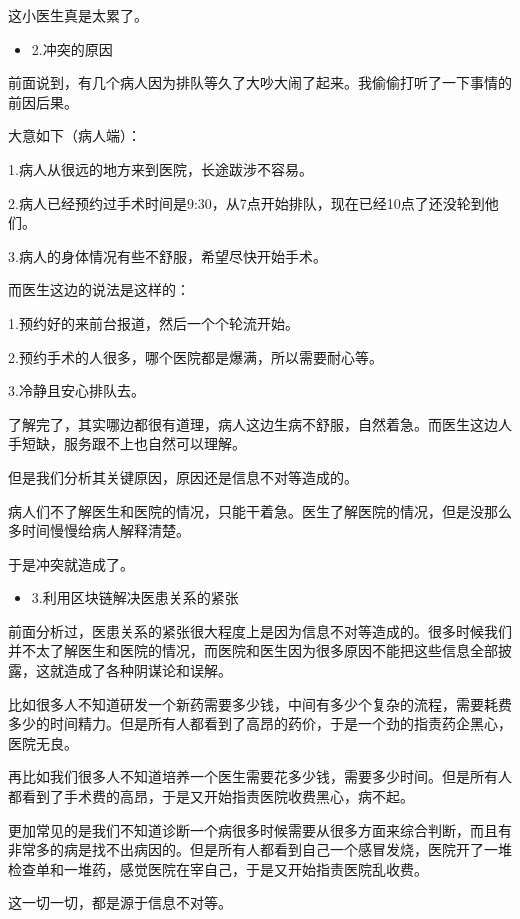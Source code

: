 \documentclass[]{ctexbook}
\providecommand{\tightlist}{%
  \setlength{\itemsep}{0pt}\setlength{\parskip}{0pt}}
\begin{document}
这小医生真是太累了。

\begin{itemize}
\tightlist
\item
  2.冲突的原因
\end{itemize}

前面说到，有几个病人因为排队等久了大吵大闹了起来。我偷偷打听了一下事情的前因后果。

大意如下（病人端）：

1.病人从很远的地方来到医院，长途跋涉不容易。

2.病人已经预约过手术时间是9:30，从7点开始排队，现在已经10点了还没轮到他们。

3.病人的身体情况有些不舒服，希望尽快开始手术。

而医生这边的说法是这样的：

1.预约好的来前台报道，然后一个个轮流开始。

2.预约手术的人很多，哪个医院都是爆满，所以需要耐心等。

3.冷静且安心排队去。

了解完了，其实哪边都很有道理，病人这边生病不舒服，自然着急。而医生这边人手短缺，服务跟不上也自然可以理解。

但是我们分析其关键原因，原因还是信息不对等造成的。

病人们不了解医生和医院的情况，只能干着急。医生了解医院的情况，但是没那么多时间慢慢给病人解释清楚。

于是冲突就造成了。

\begin{itemize}
\tightlist
\item
  3.利用区块链解决医患关系的紧张
\end{itemize}

前面分析过，医患关系的紧张很大程度上是因为信息不对等造成的。很多时候我们并不太了解医生和医院的情况，而医院和医生因为很多原因不能把这些信息全部披露，这就造成了各种阴谋论和误解。

比如很多人不知道研发一个新药需要多少钱，中间有多少个复杂的流程，需要耗费多少的时间精力。但是所有人都看到了高昂的药价，于是一个劲的指责药企黑心，医院无良。

再比如我们很多人不知道培养一个医生需要花多少钱，需要多少时间。但是所有人都看到了手术费的高昂，于是又开始指责医院收费黑心，病不起。

更加常见的是我们不知道诊断一个病很多时候需要从很多方面来综合判断，而且有非常多的病是找不出病因的。但是所有人都看到自己一个感冒发烧，医院开了一堆检查单和一堆药，感觉医院在宰自己，于是又开始指责医院乱收费。

这一切一切，都是源于信息不对等。
\end{document}
